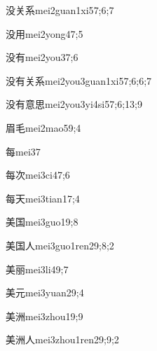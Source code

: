 \begin{verbete}{没关系}{mei2guan1xi5}{7;6;7}
\end{verbete}
\begin{verbete}{没用}{mei2yong4}{7;5}
\end{verbete}
\begin{verbete}{没有}{mei2you3}{7;6}
\end{verbete}
\begin{verbete}{没有关系}{mei2you3guan1xi5}{7;6;6;7}
\end{verbete}
\begin{verbete}{没有意思}{mei2you3yi4si5}{7;6;13;9}
\end{verbete}
\begin{verbete}{眉毛}{mei2mao5}{9;4}
\end{verbete}
\begin{verbete}{每}{mei3}{7}
\end{verbete}
\begin{verbete}{每次}{mei3ci4}{7;6}
\end{verbete}
\begin{verbete}{每天}{mei3tian1}{7;4}
\end{verbete}
\begin{verbete}{美国}{mei3guo1}{9;8}
\end{verbete}
\begin{verbete}{美国人}{mei3guo1ren2}{9;8;2}
\end{verbete}
\begin{verbete}{美丽}{mei3li4}{9;7}
\end{verbete}
\begin{verbete}{美元}{mei3yuan2}{9;4}
\end{verbete}
\begin{verbete}{美洲}{mei3zhou1}{9;9}
\end{verbete}
\begin{verbete}{美洲人}{mei3zhou1ren2}{9;9;2}
\end{verbete}
